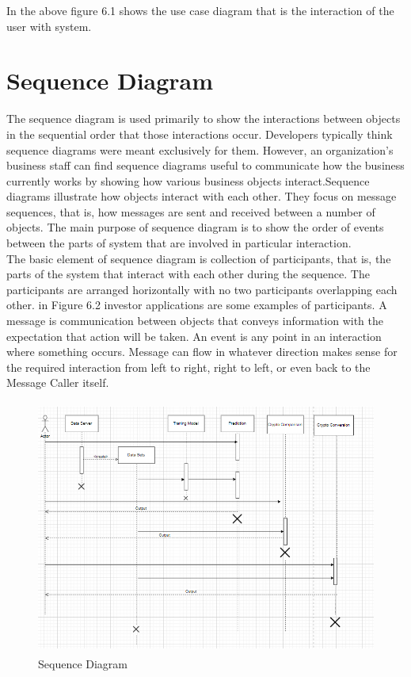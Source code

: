 \documentclass[openany,12pt]{report}
\begin{document}
In the above figure 6.1 shows the use case diagram that is the interaction of the user with system.

\newpage
\section{Sequence Diagram}
The sequence diagram is used primarily to show the interactions between objects in the sequential order that those interactions occur. Developers typically think sequence diagrams were meant exclusively for them. However, an organization's business staff can find sequence diagrams useful to communicate how the business currently works by showing how various business objects interact.Sequence diagrams illustrate how objects interact with each other. They focus on message sequences, that is, how messages are sent and received between a number of objects. The main purpose of sequence diagram is to show the order of events between the parts of system that are involved in particular interaction.\\
The basic element of sequence diagram is collection of participants, that is, the parts of the system that interact with each other during the sequence. The participants are arranged horizontally with no two participants overlapping each other. in Figure 6.2 investor applications are some examples of participants. A message is communication between objects that conveys information with the expectation that action will be taken. An event is any point in an interaction where something occurs. Message can flow in whatever direction makes sense for the required interaction from left to right, right to left, or even back to the Message Caller itself.

\begin{figure}[H]
\centering
\includegraphics[width=5in,height=3.3in]{./Sequence Dig.png}
\caption{Sequence Diagram}
\end{figure}
\end{document}
